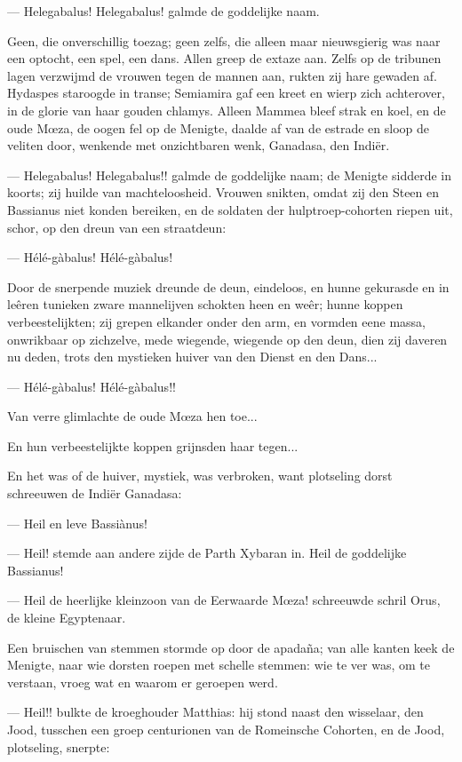 \documentclass[a4paper, 12pt, oneside, dutch]{article}
\begin{document}
--- Helegabalus! Helegabalus! galmde de goddelijke naam.

Geen, die onverschillig toezag; geen zelfs, die alleen maar nieuwsgierig was naar een optocht, een spel, een dans. Allen greep de extaze aan. Zelfs op de tribunen lagen verzwijmd de vrouwen tegen de mannen aan, rukten zij hare gewaden af. Hydaspes staroogde in transe; Semiamira gaf een kreet en wierp zich achterover, in de glorie van haar gouden chlamys. Alleen Mammea bleef strak en koel, en de oude Mœza, de oogen fel op de Menigte, daalde af van de estrade en sloop de veliten door, wenkende met onzichtbaren wenk, Ganadasa, den Indiër.

--- Helegabalus! Helegabalus!! galmde de goddelijke naam; de Menigte sidderde in koorts; zij huilde van machteloosheid. Vrouwen snikten, omdat zij den Steen en Bassianus niet konden bereiken, en de soldaten der hulptroep-cohorten riepen uit, schor, op den dreun van een straatdeun:

--- Hélé-gàbalus! Hélé-gàbalus!

Door de snerpende muziek dreunde de deun, eindeloos, en hunne gekurasde en in leêren tunieken zware mannelijven schokten heen en weêr; hunne koppen verbeestelijkten; zij grepen elkander onder den arm, en vormden eene massa, onwrikbaar op zichzelve, mede wiegende, wiegende op den deun, dien zij daveren nu deden, trots den mystieken huiver van den Dienst en den Dans...

--- Hélé-gàbalus! Hélé-gàbalus!!

Van verre glimlachte de oude Mœza hen toe...

En hun verbeestelijkte koppen grijnsden haar tegen...

En het was of de huiver, mystiek, was verbroken, want plotseling dorst schreeuwen de Indiër Ganadasa:

--- Heil en leve Bassiànus!

--- Heil! stemde aan andere zijde de Parth Xybaran in. Heil de goddelijke Bassianus!

--- Heil de heerlijke kleinzoon van de Eerwaarde Mœza! schreeuwde schril Orus, de kleine Egyptenaar.

Een bruischen van stemmen stormde op door de apadaña; van alle kanten keek de Menigte, naar wie dorsten roepen met schelle stemmen: wie te ver was, om te verstaan, vroeg wat en waarom er geroepen werd.

--- Heil!! bulkte de kroeghouder Matthias: hij stond naast den wisselaar, den Jood, tusschen een groep centurionen van de Romeinsche Cohorten, en de Jood, plotseling, snerpte:
\end{document}

